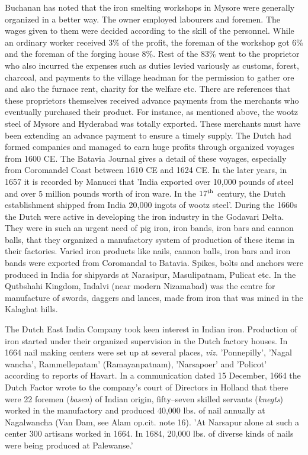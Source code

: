 Buchanan has noted that the iron smelting workshops in Mysore were generally organized in a better way. The owner employed labourers and foremen. The wages given to them were decided according to the skill of the personnel. While an ordinary worker received 3\% of the profit, the foreman of the workshop got 6\% and the foreman of the forging house 8\%. Rest of the 83\% went to the proprietor who also incurred the expenses such as duties levied variously as customs, forest, charcoal, and payments to the village headman for the permission to gather ore and also the furnace rent, charity for the welfare etc. There are references that these proprietors themselves received advance payments from the merchants who eventually purchased their product. For instance, as mentioned above, the wootz steel of Mysore and Hyderabad was totally exported. These merchants must have been extending an advance payment to ensure a timely supply. The Dutch had formed companies and managed to earn huge profits through organized voyages from 1600 CE.  The Batavia Journal gives a detail of these voyages, especially from Coromandel Coast between 1610 CE and 1624   CE.  In the later years, in 1657 it is recorded by Manucci that 'India exported over 10,000 pounds of steel and over 5 million pounds worth of iron ware.  In the $17^{\rm th}$ century, the Dutch establishment shipped from India 20,000 ingots of wootz steel'.  During the 1660s the Dutch were active in developing the iron industry in the Godavari Delta.  They were in such an urgent need of pig iron, iron bands, iron bars and cannon balls, that they organized a manufactory system of production of these items in their factories.  Varied iron products like nails, cannon balls, iron bars and iron bands were exported from Coromandal to Batavia.  Spikes, bolts and anchors were produced in India for shipyards at Narasipur, Masulipatnam, Pulicat etc.  In the Qutbshahi Kingdom, Indalvi (near modern Nizamabad) was the centre for manufacture of swords, daggers and lances, made from iron that was mined in the Kalaghat hills.

The Dutch East India Company took keen interest in Indian iron. Production of iron started under their organized supervision in the Dutch factory houses. In 1664 nail making centers were set up at several places, {\it viz.} 'Ponnepilly', 'Nagal wancha', Rammellepatam' (Ramayanpatnam), 'Narsapoer' and 'Policot' according to reports of Havart. In a communication dated 15 December, 1664 the Dutch Factor wrote to the company's court of Directors in Holland that there were 22 foremen ({\it basen}) of Indian origin, fifty–seven skilled servants ({\it knegts}) worked in the manufactory and produced 40,000 lbs. of nail annually at Nagalwancha (Van Dam, see Alam op.cit. note 16). 'At Narsapur alone at such a center 300 artisans worked in 1664. In 1684, 20,000 lbs. of diverse kinds of nails were being produced at Palewanse.'

